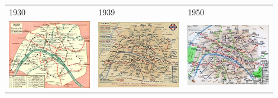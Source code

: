 \begin{tabular}{|m{0.3\linewidth}|m{0.3\linewidth}|m{0.3\linewidth}|}
\hline
1930 & 1939 & 1950\\
\includegraphics[width=\linewidth]{img/1930}&
\includegraphics[width=\linewidth]{img/1939}&
\includegraphics[width=\linewidth]{img/1950}\\

\end{tabular}
